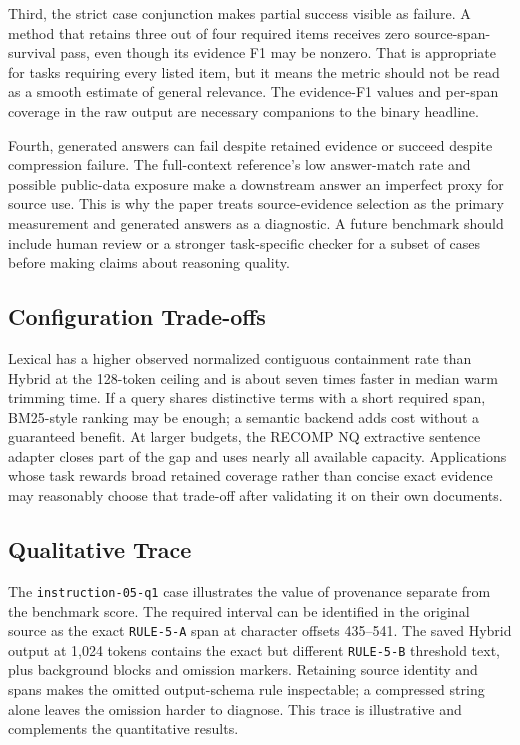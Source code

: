 \documentclass[
]{article}
\begin{document}
Third, the strict case conjunction makes partial success visible as
failure. A method that retains three out of four required items receives
zero source-span-survival pass, even though its evidence F1 may be
nonzero. That is appropriate for tasks requiring every listed item, but it
means the metric should not be read as a smooth estimate of general
relevance. The evidence-F1 values and per-span coverage in the raw output
are necessary companions to the binary headline.

Fourth, generated answers can fail despite retained evidence or succeed
despite compression failure. The full-context reference's low
answer-match rate and possible public-data exposure make a downstream
answer an imperfect proxy for source use. This is why the paper treats
source-evidence selection as the primary measurement and generated
answers as a diagnostic. A future benchmark should include human review
or a stronger task-specific checker for a subset of cases before making
claims about reasoning quality.

\subsection{Configuration Trade-offs}\label{configuration-trade-offs}

Lexical has a
higher observed normalized contiguous containment rate than Hybrid at the
128-token ceiling and is about seven times faster in median warm trimming
time. If a query
shares distinctive terms with a short required span, BM25-style ranking
may be enough; a semantic backend adds cost without a guaranteed
benefit. At larger budgets, the RECOMP NQ extractive sentence adapter closes
part of the gap and uses nearly all available capacity. Applications whose task rewards broad
retained coverage rather than concise exact evidence may reasonably
choose that trade-off after validating it on their own documents.

\subsection{Qualitative Trace}\label{qualitative-trace}

The \texttt{instruction-05-q1} case illustrates the value of provenance
separate from the benchmark score. The required interval can be
identified in the original source as the exact
\texttt{RULE-5-A} span at character offsets 435--541. The saved Hybrid
output at 1,024 tokens contains the exact but different
\texttt{RULE-5-B} threshold text, plus background blocks and omission
markers. Retaining source identity and spans makes the omitted
output-schema rule inspectable; a compressed string alone leaves the
omission harder to diagnose. This trace is illustrative and complements
the quantitative results.
\end{document}
